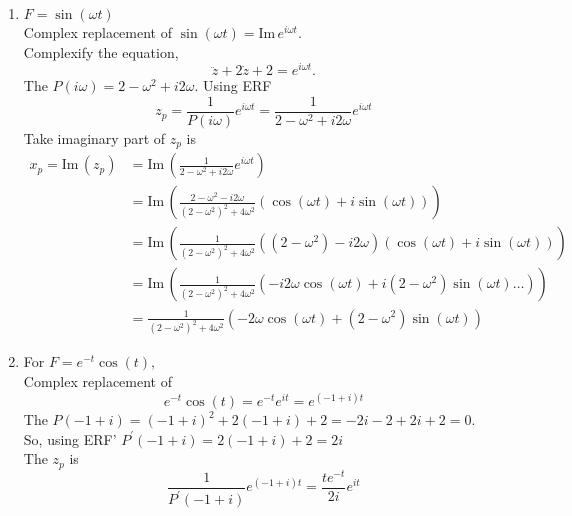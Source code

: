 \begin{enumerate}
\begin{enumerate}[label=(\alph*)]
  \item $F = \sin (\omega t)$\\
    Complex replacement of $ \sin (\omega t) = \mathrm{Im\, } e^{i \omega t}$. \\
    Complexify the equation,
    \begin{equation*}
      \ddot z + 2 \dot z + 2 = e^{i \omega t}. 
    \end{equation*}
    The $P(i \omega) = 2 - \omega ^2 +  i 2 \omega$. Using ERF
    \begin{equation*}
      z _p = \frac{1}{P(i \omega)} e^{i \omega t} =  \frac{1}{2 - \omega ^2 +  i2 \omega} e^{i \omega t}
    \end{equation*}
    Take imaginary part of $z _p$ is
    \begin{align*}
      x_p = \mathrm{Im\, } \left( z _p \right)
      &= \mathrm{Im\, } \left( \frac{1}{2 - \omega ^2 +  i2 \omega} e^{i \omega t} \right) \\
      &= \mathrm{Im\, } \left( \frac{2 - \omega^2 - i2 \omega}
        {(2 - \omega ^2)^2 + 4 \omega^2 }
        \left( \cos (\omega t) + i \sin (\omega t)  \right) \right) \\
      &= \mathrm{Im\, } \left( \frac{1}{(2 - \omega ^2)^2 + 4 \omega^2 }
        \left( (2 - \omega^2) - i2 \omega \right)
        \left( \cos (\omega t) + i \sin (\omega t) \right)\right) \\
      &= \mathrm{Im\, } \left( \frac{1}{(2 - \omega ^2)^2 + 4 \omega^2 }
        \left(-i 2 \omega \cos (\omega t) + i(2 - \omega^2) \sin (\omega t) \dots \right)\right)\\
      &= \frac{1}{(2 - \omega ^2)^2 + 4 \omega^2 }
        \left(-2 \omega \cos (\omega t) + (2 - \omega^2) \sin (\omega t) \right)
    \end{align*}
  \item For $F=e^{-t}\cos (t),\,$\\
    Complex replacement of
    \begin{equation*}
      e^{-t}\cos (t) = e^{-t} e^{it} = e^{(-1 + i)t}
    \end{equation*}
    The $P(-1 + i) = (-1 + i)^2 + 2(-1 + i) + 2 = -2i -2 + 2i + 2 = 0$. \\
    So, using ERF' $P^{\prime}(-1 + i) = 2(-1 + i) + 2 = 2i$ \\
    The $z _p$ is
    \begin{equation*}
      \frac{1}{P^{\prime}(-1 + i)}e^{(-1 + i)t} = \frac{te^{-t}}{2i} e^{it}
    \end{equation*}

\end{enumerate}
\end{enumerate}
